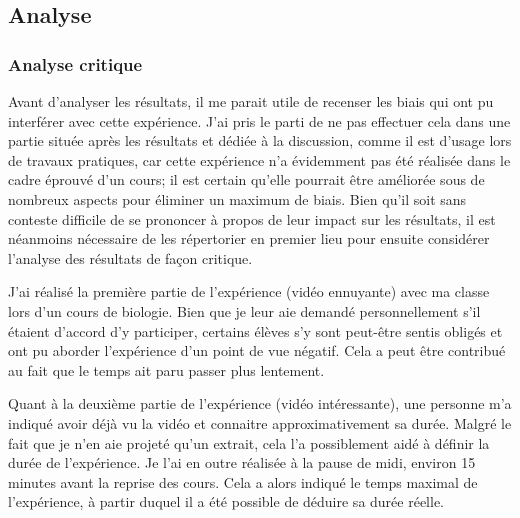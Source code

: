 \documentclass[12pt,fleqn,oneside,openany]{book} %
\begin{document}
\subsection{Analyse} \label{ssec:analyse1.1}

\subsubsection{Analyse critique} \label{sssec:analyseCrit1.1}
Avant d'analyser les résultats, il me parait utile de recenser les biais qui ont pu interférer avec cette expérience. J'ai pris le parti de ne pas effectuer cela dans une partie située après les résultats et dédiée à la discussion, comme il est d'usage lors de travaux pratiques, car cette expérience n'a évidemment pas été réalisée dans le cadre éprouvé d'un cours; il est certain qu'elle pourrait être améliorée sous de nombreux aspects pour éliminer un maximum de biais. Bien qu'il soit sans conteste difficile de se prononcer à propos de leur impact sur les résultats, il est néanmoins nécessaire de les répertorier en premier lieu pour ensuite considérer l'analyse des résultats de façon critique.

J'ai réalisé la première partie de l'expérience (vidéo ennuyante) avec ma classe lors d'un cours de biologie. Bien que je leur aie demandé personnellement s'il étaient d'accord d'y participer, certains élèves s'y sont peut-être sentis obligés et ont pu aborder l'expérience d'un point de vue négatif. Cela a peut être contribué au fait que le temps ait paru passer plus lentement.

Quant à la deuxième partie de l'expérience (vidéo intéressante), une personne m'a indiqué avoir déjà vu la vidéo et connaitre approximativement sa durée. Malgré le fait que je n'en aie projeté qu'un extrait, cela l'a possiblement aidé à définir la durée de l'expérience.
Je l'ai en outre réalisée à la pause de midi, environ 15 minutes avant la reprise des cours. Cela a alors indiqué le temps maximal de l'expérience, à partir duquel il a été possible de déduire sa durée réelle. 
\end{document}
